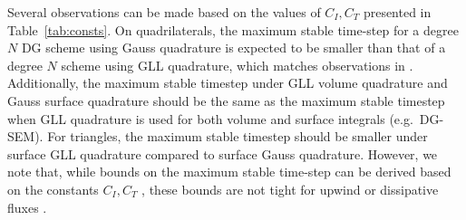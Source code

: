 \documentclass{svjour3}                     %
\begin{document}
Several observations can be made based on the values of $C_I, C_T$ presented in Table~\ref{tab:consts}.  On quadrilaterals, the maximum stable time-step for a degree $N$ DG scheme using Gauss quadrature is expected to be smaller than that of a degree $N$ scheme using GLL quadrature, which matches observations in \cite{gassner2011comparison}.  Additionally, the maximum stable timestep under GLL volume quadrature and Gauss surface quadrature should be the same as the maximum stable timestep when GLL quadrature is used for both volume and surface integrals (e.g.\ DG-SEM).  For triangles, the maximum stable timestep should be smaller under surface GLL quadrature compared to surface Gauss quadrature.  However, we note that, while bounds on the maximum stable time-step can be derived based on the constants $C_I, C_T$ \cite{chan2015gpu, chan2018multi}, these bounds are not tight for upwind or dissipative fluxes \cite{krivodonova2013analysis}.  

%




\end{document}
